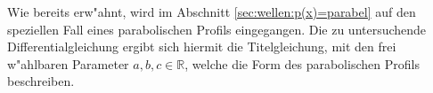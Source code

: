 Wie bereits erw"ahnt, wird im Abschnitt \ref{sec:wellen:p(x)=parabel} auf den 
speziellen Fall eines parabolischen Profils eingegangen. Die zu untersuchende 
Differentialgleichung ergibt sich hiermit die Titelgleichung, mit den frei 
w"ahlbaren Parameter ${a,b,c} \in \mathbb{R}$, welche die Form des 
parabolischen Profils beschreiben.

